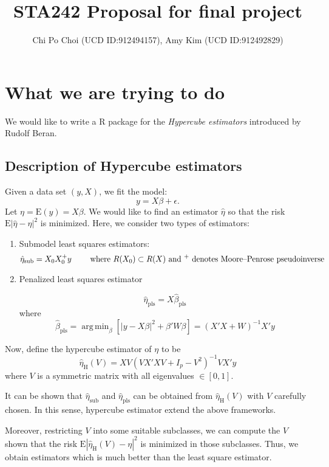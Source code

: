 \documentclass[draft]{article}
\title{STA242 Proposal for final project}
\author{Chi Po Choi (UCD ID:912494157), Amy Kim (UCD ID:912492829)}
\DeclareMathOperator*{\argmin}{arg\,min}
\begin{document}
\maketitle

\section{What we are trying to do}
We would like to write a R package for the \emph{Hypercube estimators} \cite{Beran} introduced by Rudolf Beran. 

\subsection{Description of Hypercube estimators}
Given a data set $(y, X)$, we fit the model:
$$
y = X\beta + \epsilon.
$$
Let $\eta = \text{E}(y) = X\beta$. We would like to find an estimator $\hat{\eta}$ so that the risk $\text{E} | \hat{\eta} - \eta|^2$ is minimized. Here, we consider two types of estimators:

\begin{enumerate}
	\item Submodel least squares estimators:
	$$
		\hat{\eta}_\text{sub} = X_0 X_0^+ y \qquad \text{ where $R(X_0) \subset R(X)$ and \textsuperscript{+} denotes Moore–Penrose pseudoinverse}
	$$
	\item Penalized least squares estimator

	$$
		\hat{\eta}_\text{pls} = X \hat{\beta}_\text{pls}
	$$
	where 
	$$
		\hat{\beta}_\text{pls} = \argmin_{\beta} [ | y - X\beta |^2 + \beta' W \beta ] = (X'X + W)^{-1} X' y 
	$$
\end{enumerate}

Now, define the hypercube estimator of $\eta$ to be
$$
\hat{\eta}_\text{H} (V) = X V (V X'X V + I_p - V^2)^{-1} V X' y
$$
where $V$ is a symmetric matrix with all eigenvalues $\in [0,1]$.

It can be shown that $\hat{\eta}_\text{sub}$ and $\hat{\eta}_\text{pls}$ can be obtained from $\hat{\eta}_\text{H} (V)$ with $V$ carefully chosen. In this sense, hypercube estimator extend the above frameworks.

Moreover, restricting $V$ into some suitable subclasses, we can compute the $V$ shown that the risk $\text{E} | \hat{\eta}_\text{H}(V) - \eta|^2$ is minimized in those subclasses. Thus, we obtain estimators which is much better than the least square estimator. 
\end{document}
